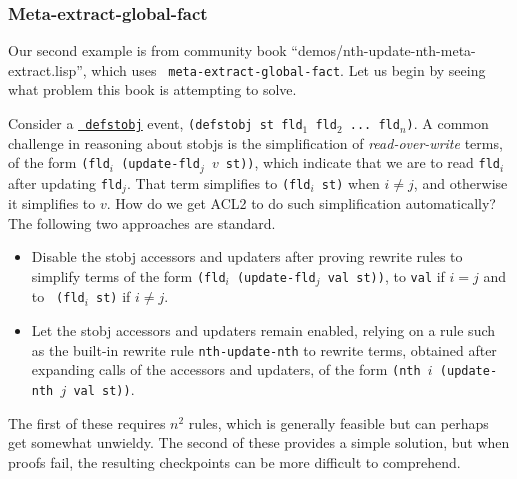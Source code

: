 \subsubsection{Meta-extract-global-fact}

Our second example is from community book
  ``demos/nth-update-nth-meta-extract.lisp'', which uses {\tt
  meta-extract-global-fact}.  Let us begin by seeing what problem this
book is attempting to solve.

\begin{comment}
  I like this section but it's pretty long --- about 3.5 pages.  Could
  we omit the details about the macro that generalizes this to an
  arbitrary stobj and just assert that it's easy to do?  I think most
  people who will understand this paper could figure out how to do
  that.

  [Matt] Good idea -- I've done that, leaving only a brief description
  of the macro.
\end{comment}

Consider a
\href{http://www.cs.utexas.edu/users/moore/acl2/manuals/current/manual/index.html?topic=ACL2\_\_\_\_DEFSTOBJ}{\underline{\tt
    defstobj}} event, {\tt (defstobj st fld$_1$ fld$_2$ ... fld$_n$)}.
A common challenge in reasoning about stobjs is the simplification of
{\em read-over-write} terms, of the form {\tt (fld$_i$ (update-fld$_j$
  $v$ st))}, which indicate that we are to read {\tt fld$_i$} after
updating {\tt fld$_j$}.  That term simplifies to {\tt (fld$_i$ st)}
when $i \neq j$, and otherwise it simplifies to $v$.  How do we get
ACL2 to do such simplification automatically?  The following two
approaches are standard.

\begin{itemize}

\item Disable the stobj accessors and updaters after proving
  rewrite rules to simplify terms of the form {\tt (fld$_i$
    (update-fld$_j$ val st))}, to {\tt val} if $i = j$ and to {\tt
    (fld$_i$ st)} if $i \neq j$.

\item Let the stobj accessors and updaters remain enabled, relying on
  a rule such as the built-in rewrite rule {\tt nth-update-nth} to
  rewrite terms, obtained after expanding calls of the accessors and
  updaters, of the form {\tt (nth $i$ (update-nth $j$ val st))}.

\end{itemize}

\noindent The first of these requires $n^2$ rules, which is generally feasible
but can perhaps get somewhat unwieldy.  The second of these provides a
simple solution, but when proofs fail, the resulting checkpoints can
be more difficult to comprehend.

